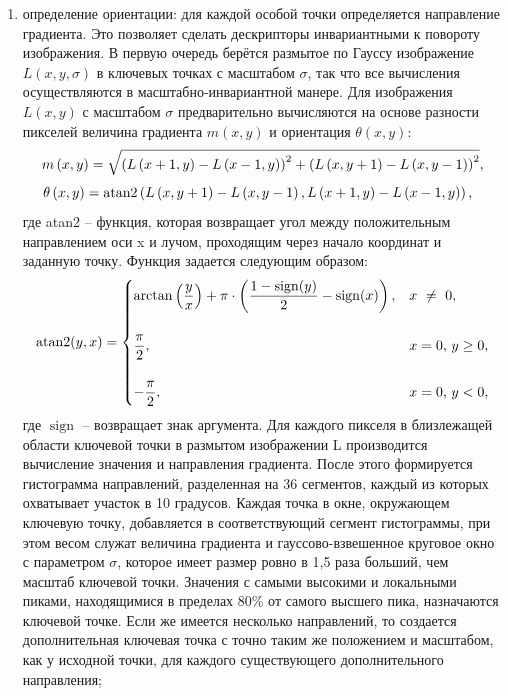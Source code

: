 \documentclass[14pt, a4paper]{extreport}
\begin{document}
\begin{enumerate}[label={\arabic*)}]
		\item определение ориентации: для каждой особой точки определяется направление градиента. Это позволяет сделать дескрипторы инвариантными к повороту изображения. В первую очередь берётся размытое по Гауссу изображение $L\left(x,y,\sigma \right)$ в ключевых точках с масштабом $\sigma$, так что все вычисления осуществляются в масштабно-инвариантной манере. Для изображения $L\left(x,y\right)$ с масштабом $\sigma$  предварительно вычисляются на основе разности пикселей величина градиента $m\left(x,y\right)$ и ориентация $\theta \left(x,y\right)$:
		\begin{equation*}
			m\left(x,y\right)={\sqrt {\left(L\left(x+1,y\right)-L\left(x-1,y\right)\right)^{2}+\left(L\left(x,y+1\right)-L\left(x,y-1\right)\right)^{2}}},
			\label{m(x,y,sigma)}
			\vspace*{-0.4cm}
		\end{equation*}
		\begin{equation*}
			\hspace{-0.25cm}\theta \left(x,y\right)=\mathrm {atan2} \left(L\left(x,y+1\right)-L\left(x,y-1\right),L\left(x+1,y\right)-L\left(x-1,y\right)\right),
			\label{teta(x,y,sigma)}
			\vspace*{-0.35cm}
		\end{equation*}
		где atan2 -- функция, которая возвращает угол между положительным направлением оси x и лучом, проходящим через начало координат и заданную точку.
		Функция задается следующим образом:
		\begin{equation*}
			\operatorname{atan2}(y, x) = 
			\begin{dcases}
				\arctan\left(\frac{y}{x}\right) + \pi \cdot \left( \frac{1 - \operatorname{sign}(y)}{2} - \operatorname{sign}(x) \right), & x~\ne~0, \vspace*{0.4cm} \\ 
				\frac{\pi}{2}, & x=0 \textup{, } y\ge0, 
				\vspace*{0.4cm} \\ 
				-\frac{\pi}{2}, &  x=0 \textup{, } y<0, 
			\end{dcases}
			\label{m(x,y,sigma)}
			\vspace*{-0.1cm}
		\end{equation*}
		где $\operatorname{sign}$ -- возвращает знак аргумента. Для каждого пикселя в близлежащей области ключевой точки в размытом изображении L производится вычисление значения и направления градиента. После этого формируется гистограмма направлений, разделенная на 36 сегментов, каждый из которых охватывает участок в 10 градусов. Каждая точка в окне, окружающем ключевую точку, добавляется в соответствующий сегмент гистограммы, при этом весом служат величина градиента и гауссово-взвешенное круговое окно с параметром $\sigma$, которое имеет размер ровно в 1,5 раза больший, чем масштаб ключевой точки. Значения с самыми высокими и локальными пиками, находящимися в пределах 80\% от самого высшего пика, назначаются ключевой точке. Если же имеется несколько направлений, то создается дополнительная ключевая точка с точно таким же положением и масштабом, как у исходной точки, для каждого существующего дополнительного направления;

\end{enumerate}
\end{document}
